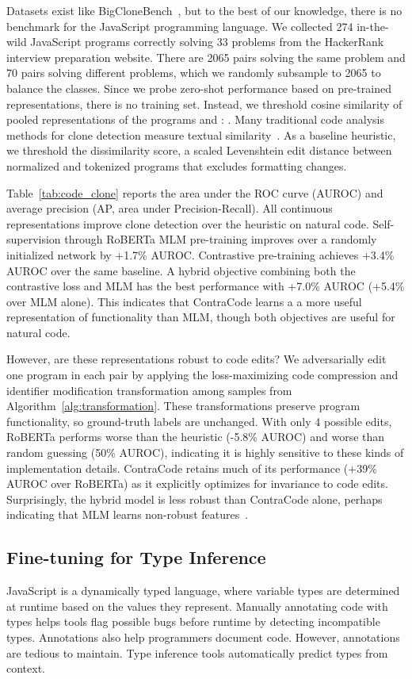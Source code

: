 \documentclass{article}
\newcommand{\thou}[0]{}
\newcommand{\ours}[0]{ContraCode}
\begin{document}
Datasets exist like BigCloneBench~\citep{10.1109/ICSME.2014.77}, but to the best of our knowledge, there is no benchmark for the JavaScript programming language. We collected 274 in-the-wild JavaScript programs correctly solving 33 problems from the HackerRank interview preparation website. 
There are 2065 pairs solving the same problem and 70\thou{} pairs solving different problems, which we randomly subsample to 2065 to balance the classes. Since we probe zero-shot performance based on pre-trained representations, there is no training set. Instead, we threshold cosine similarity of pooled representations of the programs  and : .
Many traditional code analysis methods for clone detection measure textual similarity~\cite{Baker92aprogram}. As a baseline heuristic, we threshold the dissimilarity score, a scaled Levenshtein edit distance between normalized and tokenized programs that excludes formatting changes.

Table~\ref{tab:code_clone} reports the area under the ROC curve (AUROC) and average precision (AP, area under Precision-Recall). All continuous representations improve clone detection over the heuristic on natural code. Self-supervision through RoBERTa MLM pre-training improves over a randomly initialized network by +1.7\% AUROC. Contrastive pre-training achieves +3.4\% AUROC over the same baseline. A hybrid objective combining both the contrastive loss and MLM has the best performance with +7.0\% AUROC (+5.4\% over MLM alone). This indicates that \ours{} learns a a more useful representation of functionality than MLM, though both objectives are useful for natural code.

However, are these representations robust to code edits? We adversarially edit one program in each pair by applying the loss-maximizing code compression and identifier modification transformation among  samples from Algorithm~\ref{alg:transformation}. These transformations preserve program functionality, so ground-truth labels are unchanged. With only 4 possible edits, RoBERTa performs worse than the heuristic (-5.8\% AUROC) and worse than random guessing (50\% AUROC), indicating it is highly sensitive to these kinds of implementation details. \ours{} retains much of its performance (+39\% AUROC over RoBERTa) as it explicitly optimizes for invariance to code edits. Surprisingly, the hybrid model is less robust than \ours{} alone, perhaps indicating that MLM learns non-robust features~\cite{NEURIPS2019_e2c420d9}.

\subsection{Fine-tuning for Type Inference}
\label{sec:experiments_type_inference}
JavaScript is a dynamically typed language, where variable types are determined at runtime based on the values they represent. Manually annotating code with types helps tools flag possible bugs before runtime by detecting incompatible types. Annotations also help programmers document code. However, annotations are tedious to maintain. Type inference tools automatically predict types from context.
\end{document}
